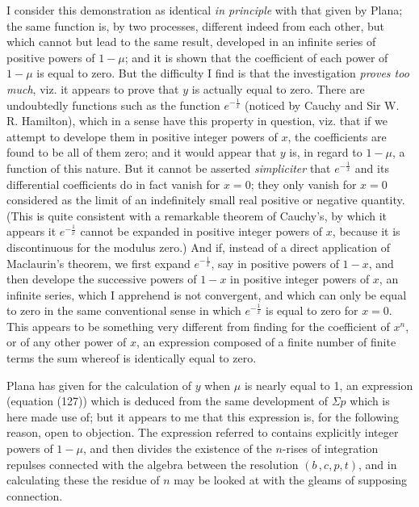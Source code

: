\documentclass[11pt,a4paper]{article}
\begin{document}
I consider this demonstration as identical \textit{in principle} with that given by Plana; the same function is, by two processes, different indeed from each other, but which cannot but lead to the same result, developed in an infinite series of positive powers of $1-\mu$; and it is shown that the coefficient of each power of $1-\mu$ is equal to zero. But the difficulty I find is that the investigation \textit{proves too much}, viz. it appears to prove that $y$ is actually equal to zero. There are undoubtedly functions such as the function $e^{-\frac{1}{x}}$ (noticed by Cauchy and Sir W. R. Hamilton), which in a sense have this property in question, viz. that if we attempt to develope them in positive integer powers of $x$, the coefficients are found to be all of them zero; and it would appear that $y$ is, in regard to $1-\mu$, a function of this nature. But it cannot be asserted \textit{simpliciter} that $e^{-\frac{1}{x}}$ and its differential coefficients do in fact vanish for $x=0$; they only vanish for $x=0$ considered as the limit of an indefinitely small real positive or negative quantity. (This is quite consistent with a remarkable theorem of Cauchy's, by which it appears it $e^{-\frac{1}{x}}$ cannot be expanded in positive integer powers of $x$, because it is discontinuous for the modulus zero.) And if, instead of a direct application of Maclaurin's theorem, we first expand $e^{-\frac{1}{x}}$, say in positive powers of $1-x$, and then develope the successive powers of $1-x$ in positive integer powers of $x$, an infinite series, which I apprehend is not convergent, and which can only be equal to zero in the same conventional sense in which $e^{-\frac{1}{x}}$ is equal to zero for $x=0$. This appears to be something very different from finding for the coefficient of $x^n$, or of any other power of $x$, an expression composed of a finite number of finite terms the sum whereof is identically equal to zero.

Plana has given for the calculation of $y$ when $\mu$ is nearly equal to 1, an expression (equation (127)) which is deduced from the same development of $\Sigma p$ which is here made use of; but it appears to me that this expression is, for the following reason, open to objection. The expression referred to contains explicitly integer powers of $1-\mu$, and then divides the existence of the $n$-rises of integration repulses connected with the algebra between the resolution $(b\,, c, p, t)$, and in calculating these the residue of $n$ may be looked at with the gleams of supposing connection.
\end{document}
